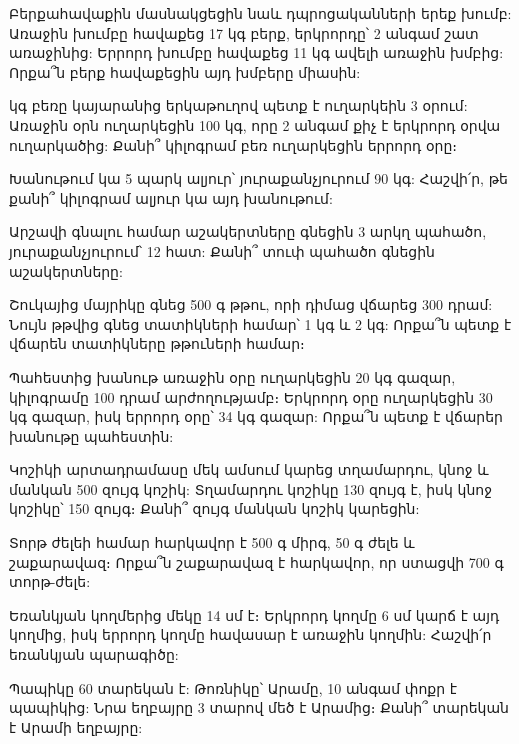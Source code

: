 \problem
Բերքահավաքին մասնակցեցին նաև դպրոցականների երեք խումբ: Առաջին 
խումբը հավաքեց 17 կգ բերք, երկրորդը՝ 2 անգամ շատ առաջինից: Երրորդ 
խումբը հավաքեց 11 կգ ավելի առաջին խմբից: Որքա՞ն բերք հավաքեցին 
այդ խմբերը միասին:

 կգ բեռը կայարանից երկաթուղով պետք է ուղարկեին 3 օրում: Առաջին 
օրն ուղարկեցին 100 կգ, որը 2 անգամ քիչ է երկրորդ օրվա ուղարկածից: 
Քանի՞ կիլոգրամ բեռ ուղարկեցին երրորդ օրը։

\problem
Խանութում կա 5 պարկ ալյուր՝ յուրաքանչյուրում 90 կգ: Հաշվի՛ր, թե 
քանի՞ կիլոգրամ ալյուր կա այդ խանութում:

\problem
Արշավի գնալու համար աշակերտները գնեցին 3 արկղ պահածո, յուրաքանչյուրում՝ 
12 հատ: Քանի՞ տուփ պահածո գնեցին աշակերտները:

\problem
Շուկայից մայրիկը գնեց 500 գ թթու, որի դիմաց վճարեց 300 դրամ: Նույն 
թթվից գնեց տատիկների համար՝ 1 կգ և 2 կգ: Որքա՞ն պետք է վճարեն 
տատիկները թթուների համար։

\problem
Պահեստից խանութ առաջին օրը ուղարկեցին 20 կգ գազար, կիլոգրամը 100 
դրամ արժողությամբ։ Երկրորդ օրը ուղարկեցին 30 կգ գազար, իսկ երրորդ 
օրը՝ 34 կգ գազար: Որքա՞ն պետք է վճարեր խանութը պահեստին:

\problem
Կոշիկի արտադրամասը մեկ ամսում կարեց տղամարդու, կնոջ և մանկան 500 
զույգ կոշիկ: Տղամարդու կոշիկը 130 զույգ է, իսկ կնոջ կոշիկը՝ 150 
զույգ։ Քանի՞ զույգ մանկան կոշիկ կարեցին:

\problem
Տորթ ժելեի համար հարկավոր է 500 գ միրգ, 50 գ ժելե և շաքարավազ։ 
Որքա՞ն շաքարավազ է հարկավոր, որ ստացվի 700 գ տորթ-ժելե:

\problem
Եռանկյան կողմերից մեկը 14 սմ է։ Երկրորդ կողմը 6 սմ կարճ է այդ 
կողմից, իսկ երրորդ կողմը հավասար է առաջին կողմին: Հաշվի՛ր եռանկյան 
պարագիծը:

\problem
Պապիկը 60 տարեկան է: Թոռնիկը՝ Արամը, 10 անգամ փոքր է պապիկից: 
Նրա եղբայրը 3 տարով մեծ է Արամից։ Քանի՞ տարեկան է Արամի եղբայրը:

\solution

\bye
